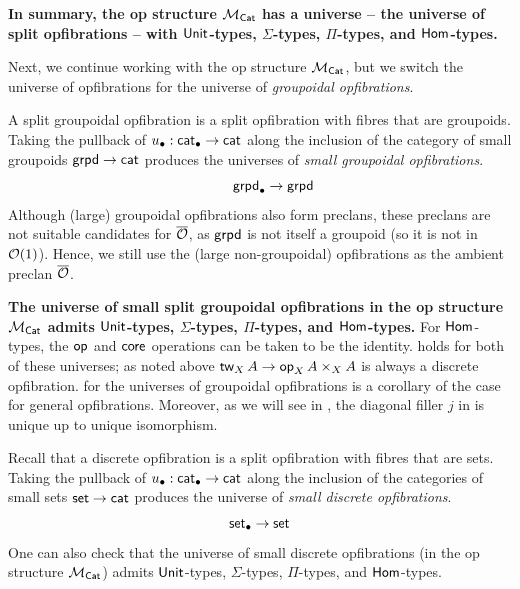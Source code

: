 \begin{example}
  {\bf In summary, the op structure $\MM_\Cat$ has a universe --
  the universe of split opfibrations -- with
  $\Unit$-types, $\Sigma$-types, $\Pi$-types, and $\Hom$-types.}
\end{example}

Next, we continue working with the op structure $\MM_\Cat$,
but we switch the universe of opfibrations
for the universe of \emph{groupoidal opfibrations}.

\begin{example}\label{ex:groupoidal-opfibrations}
  A split groupoidal opfibration is a
  split opfibration with fibres that are groupoids.
  Taking the pullback of $\ulow : \pcat \to \cat$ along the inclusion
  of the category of small groupoids
  $\grpd \to \cat$ produces the universes
  of \emph{small groupoidal opfibrations}.
  \[\quad \quad \pgrpd \to \grpd\]
  Although (large) groupoidal opfibrations also form preclans,
  these preclans are not suitable candidates for $\opfib$,
  as $\grpd$ is not itself a groupoid (so it is not in $\opfibcart(1)$).
  Hence, we still use the (large non-groupoidal)
  opfibrations as the ambient preclan $\opfib$.

  {\bf The universe of small split groupoidal opfibrations in the op structure $\MM_\Cat$ admits
  $\Unit$-types, $\Sigma$-types, $\Pi$-types, and $\Hom$-types.}
  For $\Hom$-types, the $\vOp[]{}$ and $\vCore[]{}$ operations can be taken to be the identity.
   holds for both of these universes;
  as noted above $\vTw[X] A \to \vOp[X] A \times_X A$
  is always a discrete opfibration.
   for the universes of groupoidal opfibrations
  is a corollary of the case for general opfibrations.
  Moreover, as we will see in ,
  the diagonal filler $j$ in 
  is unique up to unique isomorphism.
\end{example}

\begin{example}\label{ex:discrete-opfibrations}
  Recall that a discrete opfibration is a
  split opfibration with fibres that are sets.
  Taking the pullback of $\ulow : \pcat \to \cat$ along the inclusion
  of the categories of small sets
  $\set \to \cat$ produces the universe
  of \emph{small discrete opfibrations}.
  \[\pset \to \set\]
  One can also check that the universe of small discrete opfibrations (in the op structure $\MM_\Cat$) admits
  $\Unit$-types, $\Sigma$-types, $\Pi$-types, and $\Hom$-types.
\end{example}

